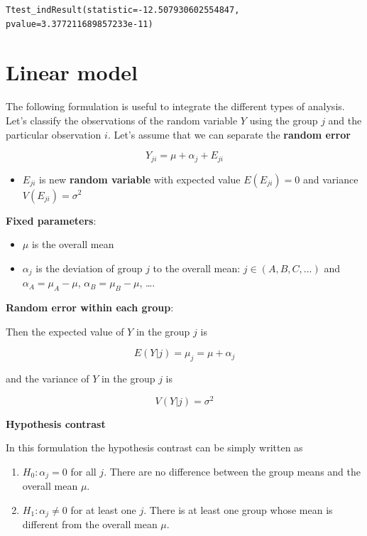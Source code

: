 \documentclass[
]{book}
\providecommand{\tightlist}{%
  \setlength{\itemsep}{0pt}\setlength{\parskip}{0pt}}
\begin{document}
\begin{verbatim}
Ttest_indResult(statistic=-12.507930602554847, pvalue=3.377211689857233e-11)
\end{verbatim}

\hypertarget{linear-model}{%
\section{Linear model}\label{linear-model}}

The following formulation is useful to integrate the different types of analysis. Let's classify the observations of the random variable \(Y\) using the group \(j\) and the particular observation \(i\). Let's assume that we can separate the \textbf{random error}

\[Y_{ji} = \mu + \alpha_j +E_{ji}\]

\begin{itemize}
\tightlist
\item
  \(E_{ji}\) is new \textbf{random variable} with expected value \(E(E_{ji})=0\) and variance \(V(E_{ji})=\sigma^2\)
\end{itemize}

\textbf{Fixed parameters}:

\begin{itemize}
\tightlist
\item
  \(\mu\) is the overall mean
\item
  \(\alpha_j\) is the deviation of group \(j\) to the overall mean: \(j \in (A,B, C, ...)\) and \(\alpha_A=\mu_A-\mu\), \(\alpha_B=\mu_B-\mu\), \ldots.
\end{itemize}

\textbf{Random error within each group}:

Then the expected value of \(Y\) in the group \(j\) is

\[E(Y| j)=\mu_j=\mu + \alpha_j\]

and the variance of \(Y\) in the group \(j\) is

\[V(Y| j)=\sigma^2\]

\textbf{Hypothesis contrast}

In this formulation the hypothesis contrast can be simply written as

\begin{enumerate}
\def\labelenumi{\alph{enumi}.}
\item
  \(H_0:\alpha_j=0\) for all \(j\). There are no difference between the group means and the overall mean \(\mu\).
\item
  \(H_1:\alpha_j\neq0\) for at least one \(j\). There is at least one group whose mean is different from the overall mean \(\mu\).
\end{enumerate}
\end{document}
